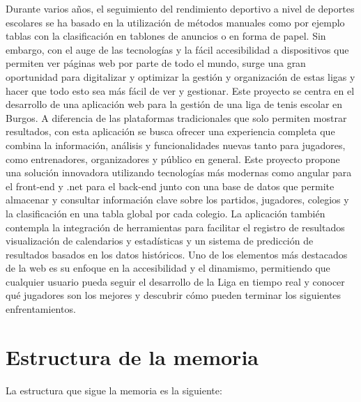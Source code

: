 
Durante varios años, el seguimiento del rendimiento deportivo a nivel de deportes escolares se ha basado en la utilización de métodos manuales como por ejemplo tablas con la clasificación en tablones de anuncios o en forma de papel. Sin embargo, con el auge de las tecnologías y la fácil accesibilidad a dispositivos que permiten ver páginas web por parte de todo el mundo, surge una gran oportunidad para digitalizar y optimizar la gestión y organización de estas ligas y hacer que todo esto sea más fácil de ver y gestionar.
Este proyecto se centra en el desarrollo de una aplicación web para la gestión de una liga de tenis escolar en Burgos. A diferencia de las plataformas tradicionales que solo permiten mostrar resultados, con esta aplicación se busca ofrecer una experiencia completa que combina la información, análisis y funcionalidades nuevas tanto para jugadores, como entrenadores, organizadores y público en general.
Este proyecto propone una solución innovadora utilizando tecnologías más modernas como angular para el front-end y .net para el back-end junto con una base de datos que permite almacenar y consultar información clave sobre los partidos, jugadores, colegios y la clasificación en una tabla global por cada colegio. La aplicación también contempla la integración de herramientas para facilitar el registro de resultados visualización de calendarios y estadísticas y un sistema de predicción de resultados basados en los datos históricos.
Uno de los elementos más destacados de la web es su enfoque en la accesibilidad y el dinamismo, permitiendo que cualquier usuario pueda seguir el desarrollo de la Liga en tiempo real y conocer qué jugadores son los mejores y descubrir cómo pueden terminar los siguientes enfrentamientos.

\section{Estructura de la memoria}\label{estructura-de-la-memoria}

La estructura que sigue la memoria es la siguiente:

